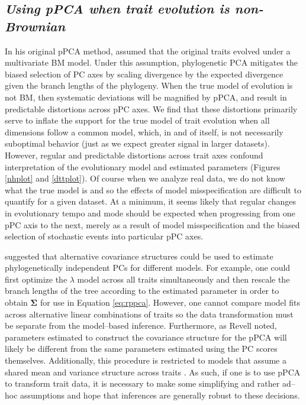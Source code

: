 \documentclass[a4paper,12pt]{article}
\begin{document}
\subsection{\emph{Using pPCA when trait evolution is non-Brownian}}
In his original pPCA method, \citet{Revell2008} assumed that the original traits evolved under a multivariate BM model. Under this assumption, phylogenetic PCA mitigates the biased selection of PC axes by scaling divergence by the expected divergence given the branch lengths of the phylogeny. When the true model of evolution is not BM, then systematic deviations will be magnified by pPCA, and result in predictable distortions across pPC axes. We find that these distortions primarily serve to inflate the support for the true model of trait evolution when all dimensions follow a common model, which, in and of itself, is not necessarily suboptimal behavior (just as we expect greater signal in larger datasets). However, regular and predictable distortions across trait axes confound interpretation of the evolutionary model and estimated parameters (Figures \ref{nhplot} and \ref{dttplot}). Of course when we analyze real data, we do not know what the true model is and so the effects of model misspecification are difficult to quantify for a given dataset. At a minimum, it seems likely that regular changes in evolutionary tempo and mode should be expected when progressing from one pPC axis to the next, merely as a result of model misspecification and the biased selection of stochastic events into particular pPC axes.

\cite{Revell2008} suggested that alternative covariance structures could be used to estimate phylogenetically independent PCs for different models. For example, one could first optimize the $\lambda$ model \citep{Pagel1999} across all traits simultaneously and then rescale the branch lengths of the tree according to the estimated parameter in order to obtain $\mathbf{\Sigma}$ for use in Equation \ref{eq:rppca}. However, one cannot compare model fits across alternative linear combinations of traits so the data transformation must be separate from the model--based inference.  Furthermore, as Revell noted, parameters estimated to construct the covariance structure for the pPCA will likely be different from the same parameters estimated using the PC scores themselves. Additionally, this procedure is restricted to models that assume a shared mean and variance structure across traits \citep[see][for examples where this does not apply]{Hansen2008, Bartoszek2012}. As such, if one is to use pPCA to transform trait data, it is necessary to make some simplifying and rather ad--hoc assumptions and hope that inferences are generally robust to these decisions.
\end{document}
